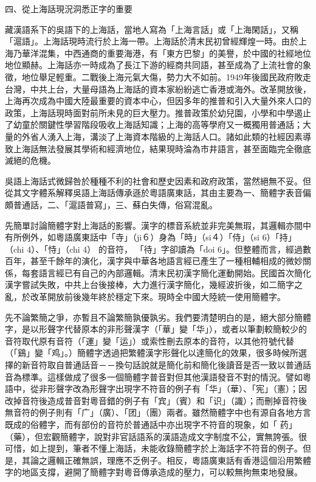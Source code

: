 \documentclass[a5paper, 10pt, openany]{book} %
\begin{document}
四、從上海話現況洞悉正字的重要

藏漢語系下的吳語下的上海話，當地人寫為「上海言話」或「上海閑話」，又稱「滬語」。上海話現時流行於上海一帶。上海話於清末民初曾經輝煌一時。由於上海乃華洋混集，中西通商的重要海港，有「東方巴黎」的美譽，於中國的社經地位地位顯赫。上海話亦一時成為了長江下游的經商共同語，甚至成為了上流社會的象徵，地位舉足輕重。二戰後上海元氣大傷，勢力大不如前。1949年後國民政府敗走台灣，中共上台，大量母語為上海話的資本家紛紛逃亡香港或海外。改革開放後，上海再次成為中國大陸最重要的資本中心，但因多年的推普和引入大量外來人口的政策，上海話現時面對前所未見的巨大壓力。推普政策於幼兒園，小學和中學遏止了幼童於關鍵性學習階段吸收上海話知識；上海的高等學府又一概獨用普通話；大量的外省人湧入上海，溝淡了上海資本階級的上海話人口。諸如此類的社經因素導致上海話無法發展其學術和經濟地位，結果現時淪為市井語言，甚至面臨完全徹底滅絕的危機。


吳語上海話式微歸咎於種種不利的社會和歷史因素和政府政策，當然絕無不妥。但從其文字體系解釋吳語上海話傳承遜於粵語廣東話，其由主要為一、簡體字表音偏頗普通話，二、「滬語普寫」，三、蘇白失傳，俗寫混亂。

先簡單討論簡體字對上海話的影響。漢字的標音系統並非完美無瑕，其邏輯亦間中有所例外，如粵語廣東話中「寺」（ji６）身為「時」（si４）「侍」（si 6）「持」（chi 4）、「恃」（chi 4） 的音符， 「待」字卻讀為「doi 6」。但整體而言，經過數百年，甚至千餘年的演化，漢字與中華各地語言經已產生了一種相輔相成的微妙關係，每套語言經已有自己的內部邏輯。清末民初漢字簡化運動開始。民國首次簡化漢字嘗試失敗，中共上台後接棒，大力進行漢字簡化，幾經波折後，如二簡字之亂，於改革開放前後幾年終於穩定下來。現時全中國大陸統一使用簡體字。

先不論繁簡之爭，亦暫且不論繁簡孰優孰劣。我們要清楚明白的是，絕大部分簡體字，是以形聲字代替原本的非形聲漢字（「華」變「华」），或者以筆劃較簡較少的音符取代原有音符（「運」變「运」）或索性刪去原本的音符，以其他符號代替（「鷄」變「鸡」。）簡體字透過把繁體漢字形聲化以達簡化的效果，很多時候所選擇的新音符取自普通話音－－換句話說就是簡化前和簡化後讀音是否一致以普通話音為標準。這樣做成了很多一個簡體字普音對但其他漢語發音不對的情況。譬如粵語中，從非形聲字改為形聲字出現字不符音的例子有「华」（華）、「宪」（憲）；因改掉音符後造成普音對粵音錯的例子有「宾」（賓）和「识」（識）；而刪掉音符後無音符的例子則有「广」（廣）、「团」（團）兩者。雖然簡體字中也有源自各地方言既成的俗體字，而有部份的音符於普通話中亦出現字不符音的現象，如「 药」（藥），但宏觀簡體字，說對非官話語系的漢語造成文字制度不公，實無誇張。很可惜，如上提到，筆者不懂上海話，未能收錄簡體字於上海話字不符音的例子。但是，其論之邏輯正確無誤，理應不乏例子。相反，粵語廣東話有香港這個沿用繁體字的地區支撐，避開了簡體字對粵音傳承造成的壓力，可以較無拘無束地發展。
\end{document}
